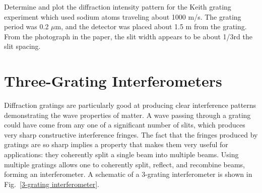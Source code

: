 \begin{exercise}
Determine and plot the diffraction intensity pattern for the Keith grating experiment which
used sodium atoms traveling about 1000 m/s. The grating period was 0.2 $\mu$m, and the detector was placed about 1.5 m from the grating. From the photograph in the paper, the slit width appears to be about 1/3rd the slit spacing.
\end{exercise}

\section{Three-Grating Interferometers}

Diffraction gratings are particularly good at producing clear interference patterns demonstrating the wave properties of matter.   A wave passing through a grating could have come from any one of a significant number of slits, which produces very sharp constructive interference fringes. The fact that the fringes produced by gratings are so sharp implies a property that makes them very useful for applications: they coherently split a single beam into multiple beams.  Using multiple gratings allows one to coherently split, reflect, and recombine beams, forming an interferometer. A schematic of a  3-grating interferometer  is shown in Fig.~\ref{3-grating interferometer}.
